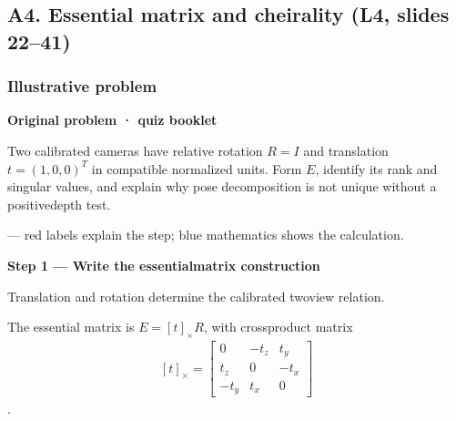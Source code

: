 \documentclass[letterpaper,11pt,english,openany,oneside]{jupyterBook}
\begin{document}
\par


\subsection{A4. Essential matrix and cheirality (L4, slides 22–41)}
\label{\detokenize{lectures/lecture04/quiz-workbook:a4-essential-matrix-and-cheirality-l4-slides-2241}}\label{\detokenize{lectures/lecture04/quiz-workbook:quiz-source-a4}}
\sphinxAtStartPar
{}


\subsubsection{Illustrative problem}
\label{\detokenize{lectures/lecture04/quiz-workbook:illustrative-problem}}\label{\detokenize{lectures/lecture04/quiz-workbook:quiz-a4-q1}}
\par\medskip\textbf{Original problem · quiz booklet}\par\smallskip

\sphinxAtStartPar
Two calibrated cameras have relative rotation \(R=I\) and translation \(t=(1,0,0)^T\) in compatible normalized units. Form \(E\), identify its rank and singular values, and explain why pose decomposition is not unique without a positive\sphinxhyphen{}depth test.

\par\medskip

\sphinxAtStartPar
{} — red labels explain the step; blue mathematics shows the calculation.

\par\medskip{}
{\color{QuizStepRed}\bfseries Step 1 — Write the essential\sphinxhyphen{}matrix construction}\par\smallskip

\sphinxAtStartPar
{} Translation and rotation determine the calibrated two\sphinxhyphen{}view relation.

\sphinxAtStartPar
The essential matrix is {\color{QuizMathBlue} \(\boxed{E=[t]_\times R}\)}, with cross\sphinxhyphen{}product matrix
{\color{QuizMathBlue} \begin{equation*}
\begin{split}
[t]_\times=\begin{bmatrix}0&-t_z&t_y\\t_z&0&-t_x\\-t_y&t_x&0\end{bmatrix}
\end{split}
\end{equation*}}
\sphinxAtStartPar
.
\end{document}
